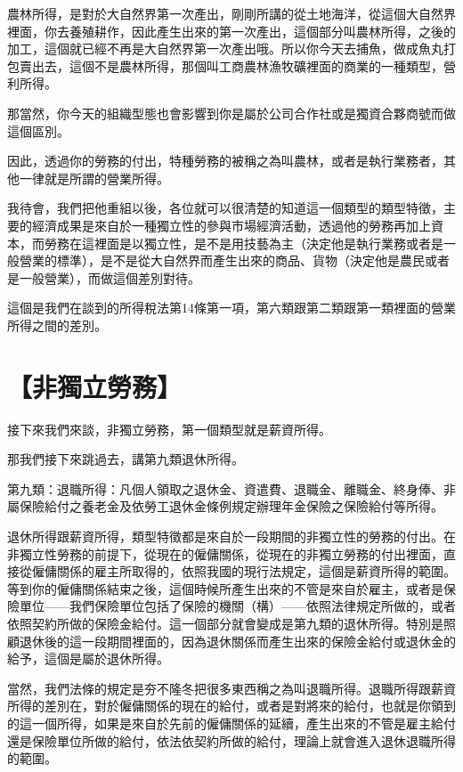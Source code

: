 \documentclass[]{ctexbook}
\begin{document}
農林所得，是對於大自然界第一次產出，剛剛所講的從土地海洋，從這個大自然界裡面，你去養殖耕作，因此產生出來的第一次產出，這個部分叫農林所得，之後的加工，這個就已經不再是大自然界第一次產出哦。所以你今天去捕魚，做成魚丸打包賣出去，這個不是農林所得，那個叫工商農林漁牧礦裡面的商業的一種類型，營利所得。

那當然，你今天的組織型態也會影響到你是屬於公司合作社或是獨資合夥商號而做這個區別。

因此，透過你的勞務的付出，特種勞務的被稱之為叫農林，或者是執行業務者，其他一律就是所謂的營業所得。

我待會，我們把他重組以後，各位就可以很清楚的知道這一個類型的類型特徵，主要的經濟成果是來自於一種獨立性的參與市場經濟活動，透過他的勞務再加上資本，而勞務在這裡面是以獨立性，是不是用技藝為主（決定他是執行業務或者是一般營業的標準），是不是從大自然界而產生出來的商品、貨物（決定他是農民或者是一般營業），而做這個差別對待。

這個是我們在談到的所得稅法第14條第一項，第六類跟第二類跟第一類裡面的營業所得之間的差別。

\hypertarget{ux975eux7368ux7acbux52deux52d9}{%
\section{【非獨立勞務】}\label{ux975eux7368ux7acbux52deux52d9}}

接下來我們來談，非獨立勞務，第一個類型就是薪資所得。

那我們接下來跳過去，講第九類退休所得。

第九類：退職所得：凡個人領取之退休金、資遣費、退職金、離職金、終身俸、非屬保險給付之養老金及依勞工退休金條例規定辦理年金保險之保險給付等所得。

退休所得跟薪資所得，類型特徵都是來自於一段期間的非獨立性的勞務的付出。在非獨立性勞務的前提下，從現在的僱傭關係，從現在的非獨立勞務的付出裡面，直接從僱傭關係的雇主所取得的，依照我國的現行法規定，這個是薪資所得的範圍。等到你的僱傭關係結束之後，這個時候所產生出來的不管是來自於雇主，或者是保險單位------我們保險單位包括了保險的機關（構）------依照法律規定所做的，或者依照契約所做的保險金給付。這一個部分就會變成是第九類的退休所得。特別是照顧退休後的這一段期間裡面的，因為退休關係而產生出來的保險金給付或退休金的給予，這個是屬於退休所得。

當然，我們法條的規定是夯不隆冬把很多東西稱之為叫退職所得。退職所得跟薪資所得的差別在，對於僱傭關係的現在的給付，或者是對將來的給付，也就是你領到的這一個所得，如果是來自於先前的僱傭關係的延續，產生出來的不管是雇主給付還是保險單位所做的給付，依法依契約所做的給付，理論上就會進入退休退職所得的範圍。
\end{document}
